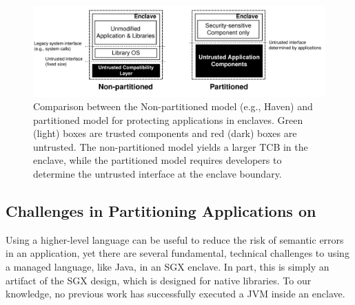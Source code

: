 \begin{figure}[t!]
\centering
\footnotesize
\includegraphics[width=6.5in]{graphene-sgx/figures/libosvssdk.pdf}
\vspace{-0.3in}
\caption[Comparison between two usage models of \sgx{}.]
{Comparison between the Non-partitioned model (e.g., Haven)
and partitioned model for protecting applications in enclaves.
Green (light) boxes are trusted components and red (dark) boxes are untrusted.
The non-partitioned model yields a larger TCB in the enclave,
while the partitioned model requires developers to determine the untrusted interface at the enclave boundary.}
\label{fig:civet:libosvssdk}
\end{figure}

\subsection{Challenges in Partitioning \java{} Applications on \sgx{}}

Using a higher-level language can be useful to reduce the risk of semantic errors in an application,
yet there are several fundamental, technical challenges to using a managed language, like Java,
in an SGX enclave.
In part, this is simply an artifact of the SGX design, which is designed
for native libraries.
To our knowledge, no previous work has successfully executed a JVM inside an enclave.

  
